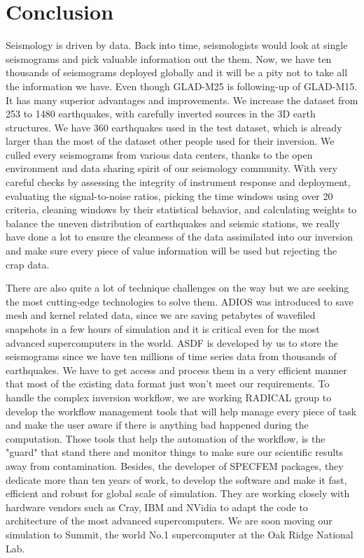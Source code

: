 \documentclass[extra,mreferee]{gji}
\begin{document}
\newpage


\section{Conclusion}

Seismology is driven by data. Back into time, seismologists would look at
single seismograms and pick valuable information out the them. Now, we have
ten thousands of seismograms deployed globally and it will be a pity not
to take all the information we have. Even though GLAD-M25 is following-up
of GLAD-M15. It has many superior advantages and improvements. We increase
the dataset from 253 to 1480 earthquakes, with carefully inverted sources
in the 3D earth structures. We have 360 earthquakes used in the test
dataset, which is already larger than the most of the dataset other people used
for their inversion. We culled every seismograms from various data centers,
thanks to the open environment and data sharing spirit of our seismology community.
With very careful checks by assessing the integrity of instrument response
and deployment, evaluating the signal-to-noise ratios, picking the time windows
using over 20 criteria, cleaning windows by their statistical behavior, and
calculating weights to balance the uneven distribution of earthquakes and
seismic stations, we really have done a lot to ensure the cleanness of the
data assimilated into our inversion and make sure every piece of value information
will be used but rejecting the crap data.

There are also quite a lot of technique challenges on the way but we are seeking
the most cutting-edge technologies to solve them. ADIOS was introduced to save mesh
and kernel related data, since we are saving petabytes of wavefiled snapshots
in a few hours of simulation and it is critical even for the most advanced
supercomputers in the world. ASDF is developed by us to store the seismograms
since we have ten millions of time series data from thousands of earthquakes.
We have to get access and process them in a very efficient manner that most of
the existing data format just won't meet our requirements. To handle the complex
inversion workflow, we are working RADICAL group to develop the workflow management
tools that will help manage every piece of task and make the user aware if there
is anything bad happened during the computation. Those tools that help the
automation of the workflow, is the "guard" that stand there and monitor things
to make sure our scientific results away from contamination. Besides, the
developer of SPECFEM packages, they dedicate more than ten years of work,
to develop the software and make it fast, efficient and robust for global scale of simulation.
They are working closely with hardware vendors such as Cray, IBM and NVidia to adapt
the code to architecture of the most advanced supercomputers. We are soon
moving our simulation to Summit, the world No.1 supercomputer at the Oak Ridge
National Lab.
\end{document}

